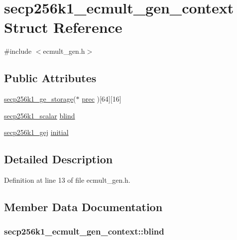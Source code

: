\hypertarget{structsecp256k1__ecmult__gen__context}{}\section{secp256k1\+\_\+ecmult\+\_\+gen\+\_\+context Struct Reference}
\label{structsecp256k1__ecmult__gen__context}


{\ttfamily \#include $<$ecmult\+\_\+gen.\+h$>$}

\subsection*{Public Attributes}
\begin{DoxyCompactItemize}
\item 
\hyperlink{structsecp256k1__ge__storage}{secp256k1\+\_\+ge\+\_\+storage}($\ast$ \hyperlink{structsecp256k1__ecmult__gen__context_ad1ebc8daeace10a8d646f89bbdf32882}{prec} )\mbox{[}64\mbox{]}\mbox{[}16\mbox{]}
\item 
\hyperlink{structsecp256k1__scalar}{secp256k1\+\_\+scalar} \hyperlink{structsecp256k1__ecmult__gen__context_af2f3064a367e86f936ab1c8b93d6f27e}{blind}
\item 
\hyperlink{structsecp256k1__gej}{secp256k1\+\_\+gej} \hyperlink{structsecp256k1__ecmult__gen__context_a1ebfe4de83e25248ea9d989d06c9b069}{initial}
\end{DoxyCompactItemize}


\subsection{Detailed Description}


Definition at line 13 of file ecmult\+\_\+gen.\+h.



\subsection{Member Data Documentation}
\hypertarget{structsecp256k1__ecmult__gen__context_af2f3064a367e86f936ab1c8b93d6f27e}{}
\subsubsection[{blind}]{ secp256k1\+\_\+ecmult\+\_\+gen\+\_\+context\+::blind}\label{structsecp256k1__ecmult__gen__context_af2f3064a367e86f936ab1c8b93d6f27e}


